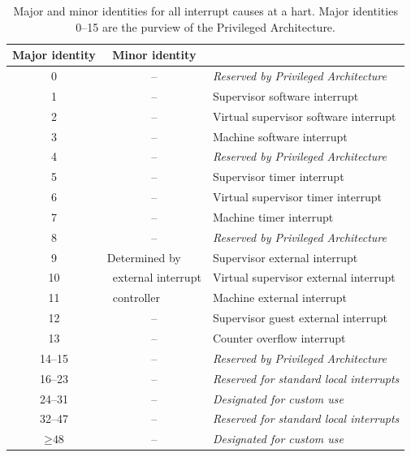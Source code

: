 \begin{table}[h!]
\begin{center}
\begin{tabular}{|c|c|l|}
\hline
Major identity & Minor identity & \\
\hline
\hline
0              & --             & \em Reserved by Privileged Architecture \\
\hline
1              & --             & Supervisor software interrupt \\
2              & --             & Virtual supervisor software interrupt \\
3              & --             & Machine software interrupt \\
\hline
4              & --             & \em Reserved by Privileged Architecture \\
\hline
5              & --             & Supervisor timer interrupt \\
6              & --             & Virtual supervisor timer interrupt \\
7              & --             & Machine timer interrupt \\
\hline
8              & --             & \em Reserved by Privileged Architecture \\
\hline
9              & \multicolumn{1}{l|}{Determined by}
                                & Supervisor external interrupt \\
10             & \multicolumn{1}{l|}{\ external interrupt}
                                & Virtual supervisor external interrupt \\
11             & \multicolumn{1}{l|}{\ controller}
                                & Machine external interrupt \\
\hline
12                   & -- & Supervisor guest external interrupt \\
13                   & -- & Counter overflow interrupt \\
14--15               & -- & \em Reserved by Privileged Architecture \\
\hline
\hline
16--23         & --       & \em Reserved for standard local interrupts \\
24--31         & --       & \em Designated for custom use \\
32--47         & --       & \em Reserved for standard local interrupts \\
$\geq \mbox{48}$ & --     & \em Designated for custom use \\
\hline
\end{tabular}
\end{center}
\caption{%
Major and minor identities for all interrupt causes at a hart.
Major identities 0--15 are the purview of the {\RISCV} Privileged
Architecture.%
}
\label{tab:interruptIdents}
\end{table}

